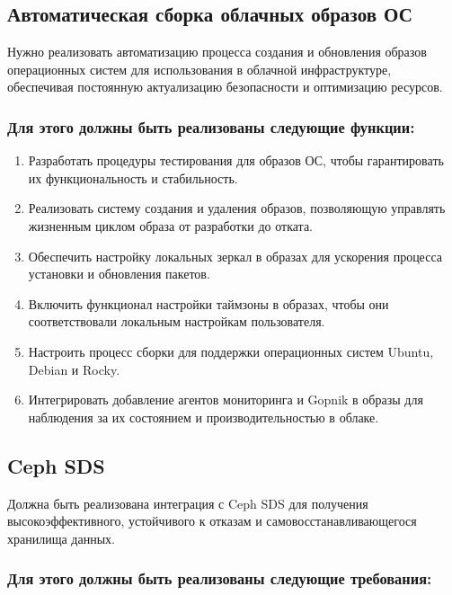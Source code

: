 \documentclass[14pt, a4paper]{extarticle}
\begin{document}
\subsection{Автоматическая сборка облачных образов ОС}

Нужно реализовать автоматизацию процесса создания и обновления образов операционных систем для использования в облачной инфраструктуре, обеспечивая постоянную актуализацию безопасности и оптимизацию ресурсов.

\subsubsection*{Для этого должны быть реализованы следующие функции:}

\begin{enumerate}
\item Разработать процедуры тестирования для образов ОС, чтобы гарантировать их функциональность и стабильность.
\item Реализовать систему создания и удаления образов, позволяющую управлять жизненным циклом образа от разработки до отката.
\item Обеспечить настройку локальных зеркал в образах для ускорения процесса установки и обновления пакетов.
\item Включить функционал настройки таймзоны в образах, чтобы они соответствовали локальным настройкам пользователя.
\item Настроить процесс сборки для поддержки операционных систем Ubuntu, Debian и Rocky.
\item Интегрировать добавление агентов мониторинга и Gopnik в образы для наблюдения за их состоянием и производительностью в облаке.
\end{enumerate}

\subsection{Ceph SDS}

Должна быть реализована интеграция с Ceph SDS для получения высокоэффективного, устойчивого к отказам и самовосстанавливающегося хранилища данных.

\subsubsection*{Для этого должны быть реализованы следующие требования:}
\end{document}
